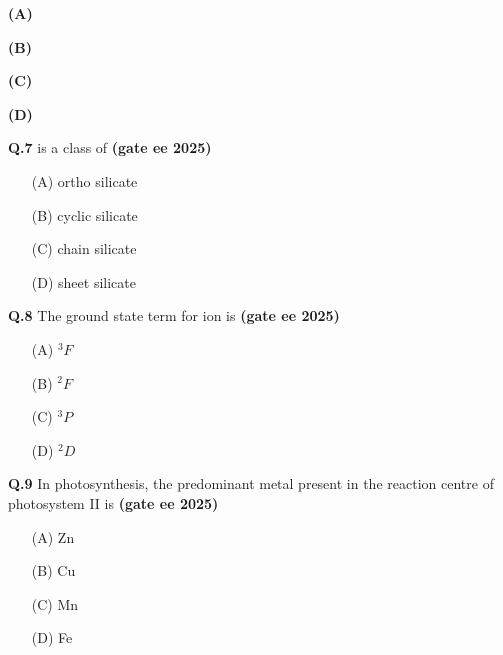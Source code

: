 \documentclass[journal,12pt,onecolumn]{exam}
\theoremstyle{remark}
\begin{document}
\begin{multicols}{2}
\noindent
\textbf{(A)} \\

\vspace{0.5cm}

\noindent
\textbf{(B)} \\

\vspace{0.5cm}

\noindent
\textbf{(C)} \\

\vspace{0.5cm}

\noindent
\textbf{(D)} \\

\end{multicols}

\noindent \textbf{Q.7}  is a class of \hfill{\textbf{(gate ee 2025)}}
\begin{multicols}{4}
    

\begin{itemize}
    \item[(A)] ortho silicate
    \item[(B)] cyclic silicate
    \item[(C)] chain silicate
    \item[(D)] sheet silicate
\end{itemize}
\end{multicols}
\vspace{0.5 cm}

\noindent \textbf{Q.8} The ground state term for  ion is \hfill{\textbf{(gate ee 2025)}}
\begin{multicols}{4}
\begin{itemize}
    \item[(A)] $^3F$
    \item[(B)] $^2F$
    \item[(C)] $^3P$
    \item[(D)] $^2D$
\end{itemize}
\end{multicols}
\vspace{0.5 cm}

\noindent \textbf{Q.9} In photosynthesis, the predominant metal present in the reaction centre of photosystem II is \hfill{\textbf{(gate ee 2025)}}
\begin{multicols}{4}
    

\begin{itemize}
    \item[(A)] Zn
    \item[(B)] Cu
    \item[(C)] Mn
    \item[(D)] Fe
\end{itemize}
\end{multicols}
\vspace{0.5 cm}
\end{document}
